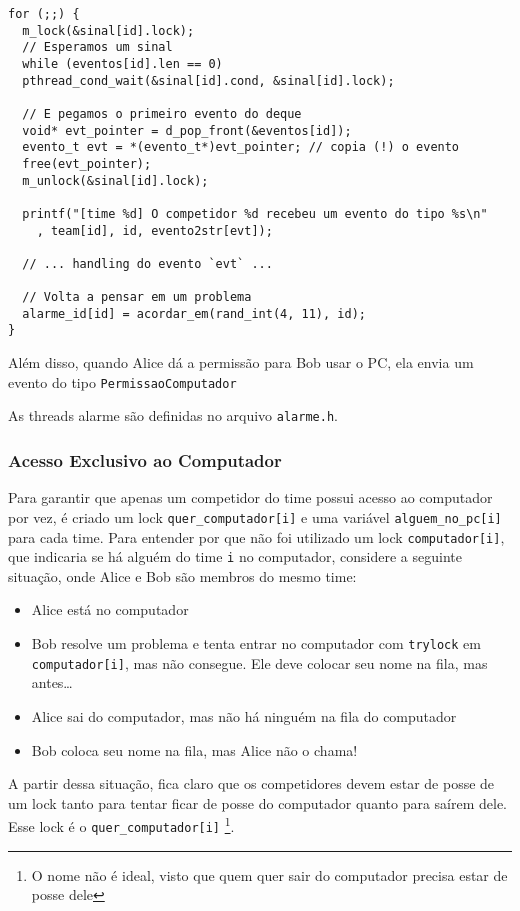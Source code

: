 \documentclass[11pt]{article}
\newcommand{\code}{\lstinline[mathescape=true]}
\begin{document}
\begin{lstlisting}[caption=Implementação da espera por um evento no código do competidor]
for (;;) {
  m_lock(&sinal[id].lock);
  // Esperamos um sinal
  while (eventos[id].len == 0)
  pthread_cond_wait(&sinal[id].cond, &sinal[id].lock);

  // E pegamos o primeiro evento do deque
  void* evt_pointer = d_pop_front(&eventos[id]);
  evento_t evt = *(evento_t*)evt_pointer; // copia (!) o evento
  free(evt_pointer);
  m_unlock(&sinal[id].lock);

  printf("[time %d] O competidor %d recebeu um evento do tipo %s\n"
    , team[id], id, evento2str[evt]);

  // ... handling do evento `evt` ...

  // Volta a pensar em um problema
  alarme_id[id] = acordar_em(rand_int(4, 11), id);
}
	\end{lstlisting}

	Além disso, quando Alice dá a permissão para Bob usar o PC, ela envia um evento do tipo
	\code{PermissaoComputador}

	As threads alarme são definidas no arquivo \code{alarme.h}.

	\subsubsection{Acesso Exclusivo ao Computador}
	Para garantir que apenas um competidor do time possui acesso ao computador por vez, é criado um lock
	\code{quer_computador[i]} e uma variável \code{alguem_no_pc[i]} para cada time. Para entender por que
	não foi utilizado um lock \code{computador[i]}, que indicaria se há alguém do time \code{i} no
	computador, considere a seguinte situação, onde Alice e Bob são membros do mesmo time:

	\begin{itemize}
		\item Alice está no computador
		\item Bob resolve um problema e tenta entrar no computador com \code{trylock} em
			\code{computador[i]}, mas não consegue. Ele deve colocar seu nome na fila, mas antes\dots
		\item Alice sai do computador, mas não há ninguém na fila do computador
		\item Bob coloca seu nome na fila, mas Alice não o chama!
	\end{itemize}

	A partir dessa situação, fica claro que os competidores devem estar de posse de um lock tanto para
	tentar ficar de posse do computador quanto para saírem dele. Esse lock é o \code{quer_computador[i]}
	\footnote{O nome não é ideal, visto que quem quer sair do computador precisa estar de posse dele}.
\end{document}
